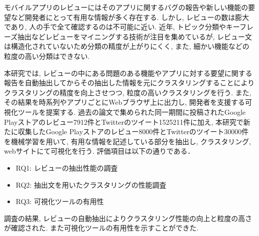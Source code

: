 
モバイルアプリのレビューにはそのアプリに関するバグの報告や新しい機能の要望など開発者にとって有用な情報が多く存在する. しかし, レビューの数は膨大であり, 人の手で全て確認するのは不可能に近い. 近年, トピック分類やキーフレーズ抽出などレビューをマイニングする技術が注目を集めているが, レビュー文は構造化されていないため分類の精度が上がりにくく, また, 細かい機能などの粒度の高い分類はできない. 

本研究では, レビューの中にある問題のある機能やアプリに対する要望に関する報告を自動抽出してからその抽出した情報を元にクラスタリングすることによりクラスタリングの精度を向上させつつ, 粒度の高いクラスタリングを行う. また, その結果を時系列やアプリごとにWebブラウザ上に出力し, 開発者を支援する可視化ツールを提案する.
過去の論文で集められた同一期間に投稿されたGoogle Playストアのレビュー7912件とTwitterのツイート1525211件に加え, 本研究で新たに収集したGoogle Playストアのレビュー8000件とTwitterのツイート30000件を機械学習を用いて, 有用な情報を記述している部分を抽出し, クラスタリング, webサイトにて可視化を行う. 評価項目は以下の通りである．
\begin{itemize}
    \item RQ1: レビューの抽出性能の調査
    \item RQ2: 抽出文を用いたクラスタリングの性能調査
    \item RQ3: 可視化ツールの有用性
\end{itemize}

調査の結果, レビューの自動抽出によりクラスタリング性能の向上と粒度の高さが確認された. また可視化ツールの有用性を示すことができた. 
